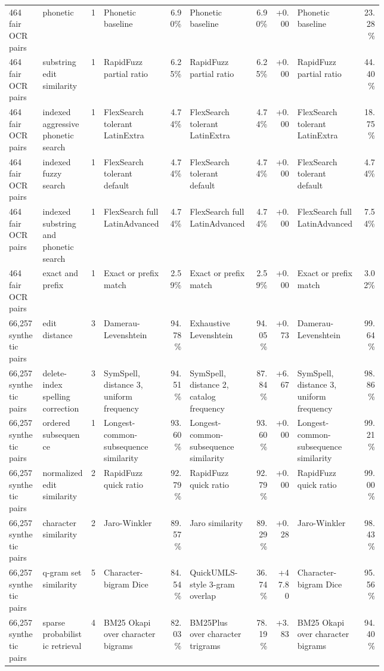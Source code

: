 \begin{landscape}
\begin{tiny}
\begin{longtable}{@{}L{0.09\linewidth}L{0.13\linewidth}rL{0.17\linewidth}rL{0.17\linewidth}rrL{0.17\linewidth}r@{}}
464 fair OCR pairs & phonetic & 1 & Phonetic baseline & 6.90\% & Phonetic baseline & 6.90\% & +0.00 & Phonetic baseline & 23.28\% \\
464 fair OCR pairs & substring edit similarity & 1 & RapidFuzz partial ratio & 6.25\% & RapidFuzz partial ratio & 6.25\% & +0.00 & RapidFuzz partial ratio & 44.40\% \\
464 fair OCR pairs & indexed aggressive phonetic search & 1 & FlexSearch tolerant LatinExtra & 4.74\% & FlexSearch tolerant LatinExtra & 4.74\% & +0.00 & FlexSearch tolerant LatinExtra & 18.75\% \\
464 fair OCR pairs & indexed fuzzy search & 1 & FlexSearch tolerant default & 4.74\% & FlexSearch tolerant default & 4.74\% & +0.00 & FlexSearch tolerant default & 4.74\% \\
464 fair OCR pairs & indexed substring and phonetic search & 1 & FlexSearch full LatinAdvanced & 4.74\% & FlexSearch full LatinAdvanced & 4.74\% & +0.00 & FlexSearch full LatinAdvanced & 7.54\% \\
464 fair OCR pairs & exact and prefix & 1 & Exact or prefix match & 2.59\% & Exact or prefix match & 2.59\% & +0.00 & Exact or prefix match & 3.02\% \\
66,257 synthetic pairs & edit distance & 3 & Damerau-Levenshtein & 94.78\% & Exhaustive Levenshtein & 94.05\% & +0.73 & Damerau-Levenshtein & 99.64\% \\
66,257 synthetic pairs & delete-index spelling correction & 3 & SymSpell, distance 3, uniform frequency & 94.51\% & SymSpell, distance 2, catalog frequency & 87.84\% & +6.67 & SymSpell, distance 3, uniform frequency & 98.86\% \\
66,257 synthetic pairs & ordered subsequence & 1 & Longest-common-subsequence similarity & 93.60\% & Longest-common-subsequence similarity & 93.60\% & +0.00 & Longest-common-subsequence similarity & 99.21\% \\
66,257 synthetic pairs & normalized edit similarity & 2 & RapidFuzz quick ratio & 92.79\% & RapidFuzz quick ratio & 92.79\% & +0.00 & RapidFuzz quick ratio & 99.00\% \\
66,257 synthetic pairs & character similarity & 2 & Jaro-Winkler & 89.57\% & Jaro similarity & 89.29\% & +0.28 & Jaro-Winkler & 98.43\% \\
66,257 synthetic pairs & q-gram set similarity & 5 & Character-bigram Dice & 84.54\% & QuickUMLS-style 3-gram overlap & 36.74\% & +47.80 & Character-bigram Dice & 95.56\% \\
66,257 synthetic pairs & sparse probabilistic retrieval & 4 & BM25 Okapi over character bigrams & 82.03\% & BM25Plus over character trigrams & 78.19\% & +3.83 & BM25 Okapi over character bigrams & 94.40\% \\

\end{longtable}
\end{tiny}
\end{landscape}
